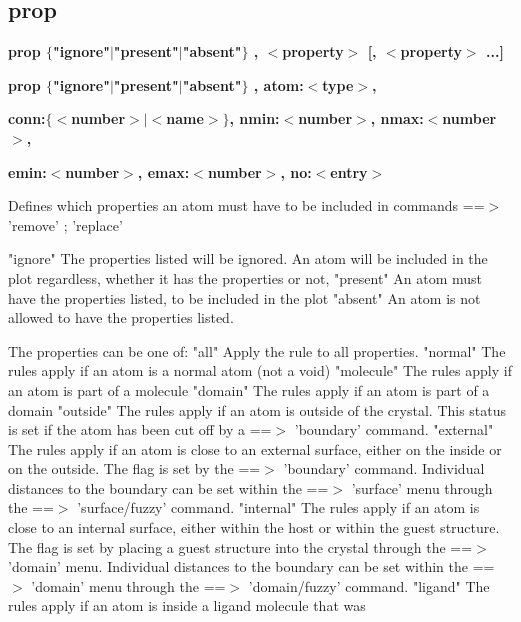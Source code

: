 \subsection*{prop}
{\bf prop $ \{$"ignore"$| $"present"$| $"absent"$\} $ , $ <$property$> $ [, $ <$property$> $ ...] \par }
{\bf prop $ \{$"ignore"$| $"present"$| $"absent"$\} $ , atom:$ <$type$> $, \par }
{\bf      conn:$ \{$$ <$number$> $$| $$ <$name$> $$\} $, nmin:$ <$number$> $, nmax:$ <$number$> $, \par }
{\bf      emin:$ <$number$> $, emax:$ <$number$> $, no:$ <$entry$> $ \par }
\par
\vspace{3pt}
Defines which properties an atom must have to be included in 
commands ==$> $ 'remove' ; 'replace' 
\par
"ignore" 
         The properties listed will be ignored. An atom will be included in 
         the plot regardless, whether it has the properties or not, 
"present" 
         An atom must have the properties listed, to be included in the plot 
"absent" 
         An atom is not allowed to have the properties listed. 
\par
The properties can be one of: 
"all" 
         Apply the rule to all properties. 
"normal" 
         The rules apply if an atom is a normal atom (not a void) 
"molecule" 
         The rules apply if an atom is part of a molecule 
"domain" 
         The rules apply if an atom is part of a domain 
"outside" 
         The rules apply if an atom is outside of the crystal. This status 
         is set if the atom has been cut off by a ==$> $ 'boundary' command. 
"external" 
         The rules apply if an atom is close to an external surface, either 
         on the inside or on the outside. 
         The flag is set by the ==$> $ 'boundary' command. Individual 
         distances to the boundary can be set within the ==$> $ 'surface' menu 
         through the ==$> $ 'surface/fuzzy' command. 
"internal" 
         The rules apply if an atom is close to an internal surface, either 
         within the host or within the guest structure. 
         The flag is set by placing a guest structure into the crystal 
         through the ==$> $ 'domain' menu. Individual distances to the 
         boundary can be set within the ==$> $ 'domain' menu through 
         the ==$> $ 'domain/fuzzy' command. 
"ligand" 
         The rules apply if an atom is inside a ligand molecule that was 
